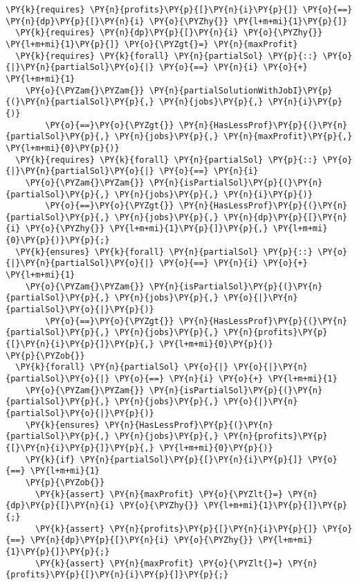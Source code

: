 \begin{itemize}
\begin{Verbatim}[commandchars=\\\{\},fontsize=\footnotesize]
  \PY{k}{requires} \PY{n}{profits}\PY{p}{[}\PY{n}{i}\PY{p}{]} \PY{o}{==} \PY{n}{dp}\PY{p}{[}\PY{n}{i} \PY{o}{\PYZhy{}} \PY{l+m+mi}{1}\PY{p}{]}
  \PY{k}{requires} \PY{n}{dp}\PY{p}{[}\PY{n}{i} \PY{o}{\PYZhy{}} \PY{l+m+mi}{1}\PY{p}{]} \PY{o}{\PYZgt{}=} \PY{n}{maxProfit}
  \PY{k}{requires} \PY{k}{forall} \PY{n}{partialSol} \PY{p}{::} \PY{o}{|}\PY{n}{partialSol}\PY{o}{|} \PY{o}{==} \PY{n}{i} \PY{o}{+} \PY{l+m+mi}{1} 
    \PY{o}{\PYZam{}\PYZam{}} \PY{n}{partialSolutionWithJobI}\PY{p}{(}\PY{n}{partialSol}\PY{p}{,} \PY{n}{jobs}\PY{p}{,} \PY{n}{i}\PY{p}{)} 
        \PY{o}{==}\PY{o}{\PYZgt{}} \PY{n}{HasLessProf}\PY{p}{(}\PY{n}{partialSol}\PY{p}{,} \PY{n}{jobs}\PY{p}{,} \PY{n}{maxProfit}\PY{p}{,} \PY{l+m+mi}{0}\PY{p}{)}
  \PY{k}{requires} \PY{k}{forall} \PY{n}{partialSol} \PY{p}{::} \PY{o}{|}\PY{n}{partialSol}\PY{o}{|} \PY{o}{==} \PY{n}{i}  
    \PY{o}{\PYZam{}\PYZam{}} \PY{n}{isPartialSol}\PY{p}{(}\PY{n}{partialSol}\PY{p}{,} \PY{n}{jobs}\PY{p}{,} \PY{n}{i}\PY{p}{)} 
        \PY{o}{==}\PY{o}{\PYZgt{}} \PY{n}{HasLessProf}\PY{p}{(}\PY{n}{partialSol}\PY{p}{,} \PY{n}{jobs}\PY{p}{,} \PY{n}{dp}\PY{p}{[}\PY{n}{i} \PY{o}{\PYZhy{}} \PY{l+m+mi}{1}\PY{p}{]}\PY{p}{,} \PY{l+m+mi}{0}\PY{p}{)}\PY{p}{;}
  \PY{k}{ensures} \PY{k}{forall} \PY{n}{partialSol} \PY{p}{::} \PY{o}{|}\PY{n}{partialSol}\PY{o}{|} \PY{o}{==} \PY{n}{i} \PY{o}{+} \PY{l+m+mi}{1} 
    \PY{o}{\PYZam{}\PYZam{}} \PY{n}{isPartialSol}\PY{p}{(}\PY{n}{partialSol}\PY{p}{,} \PY{n}{jobs}\PY{p}{,} \PY{o}{|}\PY{n}{partialSol}\PY{o}{|}\PY{p}{)} 
        \PY{o}{==}\PY{o}{\PYZgt{}} \PY{n}{HasLessProf}\PY{p}{(}\PY{n}{partialSol}\PY{p}{,} \PY{n}{jobs}\PY{p}{,} \PY{n}{profits}\PY{p}{[}\PY{n}{i}\PY{p}{]}\PY{p}{,} \PY{l+m+mi}{0}\PY{p}{)}
\PY{p}{\PYZob{}}
  \PY{k}{forall} \PY{n}{partialSol} \PY{o}{|} \PY{o}{|}\PY{n}{partialSol}\PY{o}{|} \PY{o}{==} \PY{n}{i} \PY{o}{+} \PY{l+m+mi}{1} 
    \PY{o}{\PYZam{}\PYZam{}} \PY{n}{isPartialSol}\PY{p}{(}\PY{n}{partialSol}\PY{p}{,} \PY{n}{jobs}\PY{p}{,} \PY{o}{|}\PY{n}{partialSol}\PY{o}{|}\PY{p}{)}
    \PY{k}{ensures} \PY{n}{HasLessProf}\PY{p}{(}\PY{n}{partialSol}\PY{p}{,} \PY{n}{jobs}\PY{p}{,} \PY{n}{profits}\PY{p}{[}\PY{n}{i}\PY{p}{]}\PY{p}{,} \PY{l+m+mi}{0}\PY{p}{)} 
    \PY{k}{if} \PY{n}{partialSol}\PY{p}{[}\PY{n}{i}\PY{p}{]} \PY{o}{==} \PY{l+m+mi}{1}
    \PY{p}{\PYZob{}}
      \PY{k}{assert} \PY{n}{maxProfit} \PY{o}{\PYZlt{}=} \PY{n}{dp}\PY{p}{[}\PY{n}{i} \PY{o}{\PYZhy{}} \PY{l+m+mi}{1}\PY{p}{]}\PY{p}{;}
      \PY{k}{assert} \PY{n}{profits}\PY{p}{[}\PY{n}{i}\PY{p}{]} \PY{o}{==} \PY{n}{dp}\PY{p}{[}\PY{n}{i} \PY{o}{\PYZhy{}} \PY{l+m+mi}{1}\PY{p}{]}\PY{p}{;}
      \PY{k}{assert} \PY{n}{maxProfit} \PY{o}{\PYZlt{}=} \PY{n}{profits}\PY{p}{[}\PY{n}{i}\PY{p}{]}\PY{p}{;}

\end{Verbatim}
\end{itemize}
